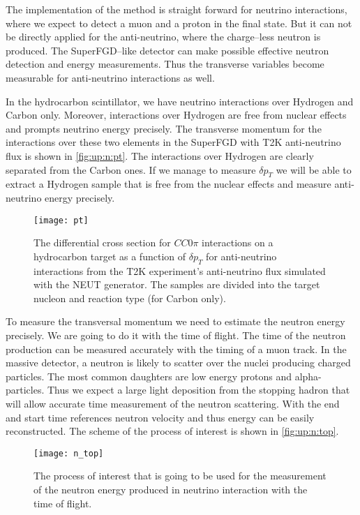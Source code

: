 \documentclass[main.tex]{subfiles}
\begin{document}
The implementation of the method is straight forward for neutrino interactions, where we expect to detect a muon and a proton in the final state. But it can not be directly applied for the anti-neutrino, where the charge--less neutron is produced. The SuperFGD--like detector can make possible effective neutron detection and energy measurements. Thus the transverse variables become measurable for anti-neutrino interactions as well.

In the hydrocarbon scintillator, we have neutrino interactions over Hydrogen and Carbon only. Moreover, interactions over Hydrogen are free from nuclear effects and prompts neutrino energy precisely. The transverse momentum for the interactions over these two elements in the SuperFGD with T2K anti-neutrino flux is shown in \autoref{fig:up:n:pt}. The interactions over Hydrogen are clearly separated from the Carbon ones. If we manage to measure $\delta p_T$ we will be able to extract a Hydrogen sample that is free from the nuclear effects and measure anti-neutrino energy precisely.

\begin{figure}[!ht]
	\centering
	\texttt{[image: pt]}
	\caption{The differential cross section for $CC0\pi$ interactions on a hydrocarbon target as a function of $\delta p_T$ for anti-neutrino interactions from the T2K experiment’s anti-neutrino flux simulated with the NEUT generator. The samples are divided into the target nucleon and reaction type (for Carbon only).}
	\label{fig:up:n:pt}
\end{figure}

To measure the transversal momentum we need to estimate the neutron energy precisely. We are going to do it with the time of flight. The time of the neutron production can be measured accurately with the timing of a muon track. In the massive detector, a neutron is likely to scatter over the nuclei producing charged particles. The most common daughters are low energy protons and alpha-particles. Thus we expect a large light deposition from the stopping hadron that will allow accurate time measurement of the neutron scattering. With the end and start time references neutron velocity and thus energy can be easily reconstructed. The scheme of the process of interest is shown in \autoref{fig:up:n:top}.

\begin{figure}[!ht]
	\centering
	\texttt{[image: n\_top]}
	\caption{The process of interest that is going to be used for the measurement of the neutron energy produced in neutrino interaction with the time of flight.}
	\label{fig:up:n:top}
\end{figure}
\end{document}
